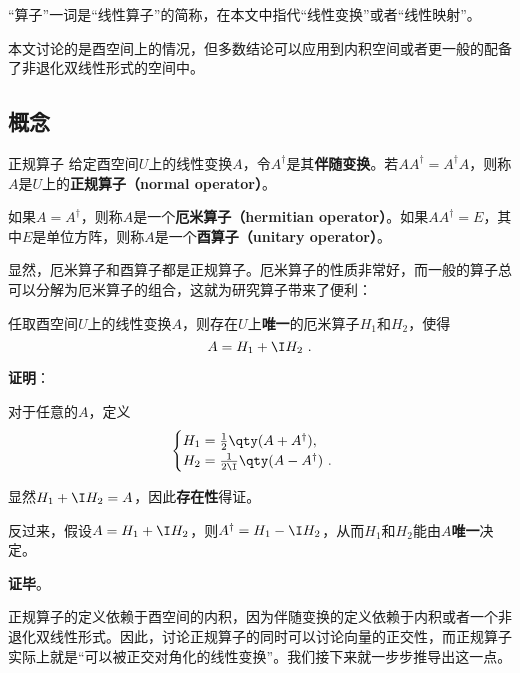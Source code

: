 

“算子”一词是“线性算子”的简称，在本文中指代“线性变换”或者“线性映射”。

本文讨论的是酉空间上的情况，但多数结论可以应用到内积空间或者更一般的配备了非退化双线性形式的空间中。

\subsection{概念}

\begin{definition}{正规算子}
给定酉空间$U$上的线性变换$A$，令$A^\dagger$是其\textbf{伴随变换}。若$AA^\dagger = A^\dagger A$，则称$A$是$U$上的\textbf{正规算子（normal operator）}。

如果$A=A^\dagger$，则称$A$是一个\textbf{厄米算子（hermitian operator）}。如果$AA^\dagger = E$，其中$E$是单位方阵，则称$A$是一个\textbf{酉算子（unitary operator）}。
\end{definition}

显然，厄米算子和酉算子都是正规算子。厄米算子的性质非常好，而一般的算子总可以分解为厄米算子的组合，这就为研究算子带来了便利：

\begin{lemma}{}
任取酉空间$U$上的线性变换$A$，则存在$U$上\textbf{唯一}的厄米算子$H_1$和$H_2$，使得
\begin{equation}
A = H_1 + \I H_2~. 
\end{equation}
\end{lemma}


\textbf{证明}：

对于任意的$A$，定义
\begin{equation}
\begin{cases}
H_1 =\frac{1}{2}\qty(A+A^\dagger), \\
H_2 =\frac{1}{2\I}\qty(A-A^\dagger)~. 
\end{cases}
\end{equation}

显然$H_1+\I H_2=A$，因此\textbf{存在性}得证。

反过来，假设$A = H_1 + \I H_2$，则$A^\dagger = H_1 - \I H_2$，从而$H_1$和$H_2$能由$A$\textbf{唯一}决定。

\textbf{证毕}。




正规算子的定义依赖于酉空间的内积，因为伴随变换的定义依赖于内积或者一个非退化双线性形式。因此，讨论正规算子的同时可以讨论向量的正交性，而正规算子实际上就是“可以被正交对角化的线性变换”。我们接下来就一步步推导出这一点。

